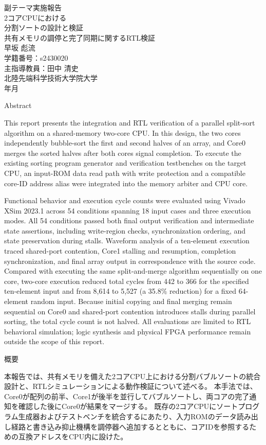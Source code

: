 \documentclass[dvipdfmx,12pt,a4j]{jreport}
\begin{document}
\thispagestyle{empty}
\begin{center}
副テーマ実施報告\\
\vfill
{\LARGE 2コアCPUにおける\\分割ソートの設計と検証}\\
\bigskip
共有メモリの調停と完了同期に関するRTL検証\\
\vfill
早坂 彪流\\
学籍番号：s2430020\\
\vfill
主指導教員：田中 清史\\
\vfill
北陸先端科学技術大学院大学\\
\vfill
\number\year 年\number\month 月\\
\vfill
\end{center}
\clearpage\pagestyle{empty}
\centerline{Abstract}\bigskip
This report presents the integration and RTL verification of a parallel split-sort algorithm on a shared-memory two-core CPU.
In this design, the two cores independently bubble-sort the first and second halves of an array, and Core0 merges the sorted halves after both cores signal completion.
To execute the existing sorting program generator and verification testbenches on the target CPU, an input-ROM data read path with write protection and a compatible core-ID address alias were integrated into the memory arbiter and CPU core.

Functional behavior and execution cycle counts were evaluated using Vivado XSim 2023.1 across 54 conditions spanning 18 input cases and three execution modes.
All 54 conditions passed both final output verification and intermediate state assertions, including write-region checks, synchronization ordering, and state preservation during stalls.
Waveform analysis of a ten-element execution traced shared-port contention, Core1 stalling and resumption, completion synchronization, and final array output in correspondence with the source code.
Compared with executing the same split-and-merge algorithm sequentially on one core, two-core execution reduced total cycles from 442 to 366 for the specified ten-element input and from 8,614 to 5,527 (a 35.8\% reduction) for a fixed 64-element random input.
Because initial copying and final merging remain sequential on Core0 and shared-port contention introduces stalls during parallel sorting, the total cycle count is not halved.
All evaluations are limited to RTL behavioral simulation; logic synthesis and physical FPGA performance remain outside the scope of this report.
\clearpage
\centerline{概要}\bigskip
本報告では、共有メモリを備えた2コアCPU上における分割バブルソートの統合設計と、RTLシミュレーションによる動作検証について述べる。
本手法では、Core0が配列の前半、Core1が後半を並行してバブルソートし、両コアの完了通知を確認した後にCore0が結果をマージする。
既存の2コアCPUにソートプログラム生成器およびテストベンチを統合するにあたり、入力ROMのデータ読み出し経路と書き込み抑止機構を調停器へ追加するとともに、コアIDを参照するための互換アドレスをCPU内に設けた。
\end{document}
